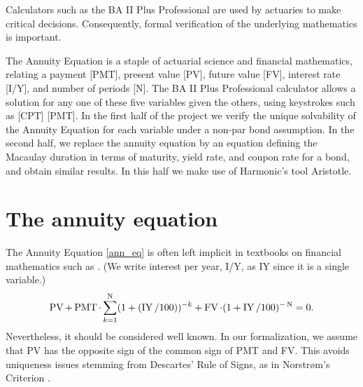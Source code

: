    Calculators such as the BA II Plus Professional are used by actuaries to make critical decisions. Consequently, formal verification of the underlying mathematics is important.

    The Annuity Equation is a staple of actuarial science and financial mathematics, relating a payment [PMT], present value [PV], future value [FV], interest rate [I/Y], and number of periods [N]. The BA II Plus Professional calculator
	allows a solution for any one of these five variables given the others, using keystrokes such as [CPT] [PMT].
    In the first half of the project we verify the unique solvability of the Annuity Equation for each variable under a non-par bond assumption. In the second half, we replace the annuity equation by an equation defining the Macaulay duration in terms of maturity, yield rate, and coupon rate for a bond, and obtain similar results. In this half we make use of Harmonic's tool Aristotle.



\section{The annuity equation}
The Annuity Equation \eqref{ann_eq} is often left implicit in textbooks on financial mathematics such as \cite{ChanTse2021_finmath}.
(We write interest per year, I/Y, as IY since it is a single variable.)
\begin{equation}\label{ann_eq}
\operatorname{PV} + \operatorname{PMT}\cdot \sum_{k=1}^{\operatorname{N}} (1 + (\operatorname{IY}/100))^{-k} + \operatorname{FV} \cdot (1 + \operatorname{IY}/100)^{-\operatorname{N}} = 0.
\end{equation}
Nevertheless, it should be considered well known.
In our formalization, we assume that PV has the opposite sign of the common sign of PMT and FV. This avoids uniqueness issues stemming from Descartes' Rule of Signs, as in Norstr{\o}m's Criterion \cite{Norstrom1972IRR}.

